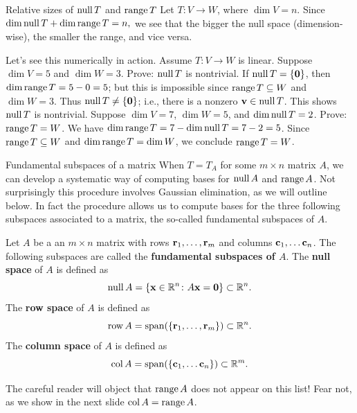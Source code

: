 \begin{frame}{Relative sizes of $\operatorname{null} T$ and $\operatorname{range} T$}
Let $T\colon V\rightarrow W$, where $\dim V=n$. Since 
$
\dim\operatorname{null} T+\dim\operatorname{range} T=n,
$
we see that the {\color{red} bigger} the null space (dimension-wise), the {\color{blue} smaller} the range, and vice versa. 

Let's see this numerically in action. Assume $T\colon V\rightarrow W$ is linear. 
\bb
\pause\ii Suppose $\dim V=5$ and $\dim W=3$. Prove: $\operatorname{null} T$ is nontrivial. 
\bpause
If $\operatorname{null} T=\{{\mathbf 0}\}$, then $\dim\operatorname{range} T=5-0=5$; but this is impossible since $\operatorname{range} T\subseteq W$ and $\dim W=3$. Thus $\operatorname{null} T\ne \{{\mathbf 0}\}$; i.e., there is a nonzero ${\mathbf v}\in\operatorname{null} T$. This shows $\operatorname{null} T$ is nontrivial. 
\pause\ii Suppose $\dim V=7$, $\dim W=5$, and $\dim\operatorname{null} T=2$. Prove: $\operatorname{range} T= W$. 
\bpause 
We have $\dim\operatorname{range} T=7-\dim\operatorname{null} T=7-2=5$. Since $\operatorname{range} T\subseteq W$ and $\dim\operatorname{range} T=\dim W$, we conclude $\operatorname{range} T=W$. 
\ee
\end{frame}

\begin{frame}{Fundamental subspaces of a matrix}
When $T=T_A$ for some $m\times n$ matrix $A$, we can develop a systematic way of computing bases for $\operatorname{null} A$ and $\operatorname{range} A$. Not surprisingly this procedure involves Gaussian elimination, as we will outline below. 
\bspace 
In fact the procedure allows us to compute bases for the three following subspaces associated to a matrix, the so-called \alert{fundamental subspaces} of $A$. 

\pause
\begin{definition}
Let $A$ be a an $m\times n$ matrix with rows ${\mathbf r}_1,\dots, {\mathbf r}_m$ and columns ${\mathbf c}_1,\dots {\mathbf c}_n$. The following subspaces are called the {\bf fundamental subspaces of $A$}. 
\bb
\ii The {\bf null space} of $A$ is defined as 
\[
\operatorname{null} A =\{{\mathbf x}\in{\mathbb R}^n\colon A{\mathbf x}={\mathbf 0}\}\subset {\mathbb R}^n.
\]
\ii The {\bf row space} of $A$ is defined as 
\[
\operatorname{row} A =\operatorname{span}(\{{\mathbf r}_1,\dots, {\mathbf r}_m\})\subset{\mathbb R}^n.
\]
\ii The {\bf column space} of $A$ is defined as 
\[
\operatorname{col} A=\operatorname{span}(\{{\mathbf c}_1,\dots {\mathbf c}_n\})\subset{\mathbb R}^m. 
\]
\ee
\end{definition}
\pause 
The careful reader will object that $\operatorname{range} A$ does not appear on this list! Fear not, as we show in the next slide \alert{$\operatorname{col} A=\operatorname{range} A$}. 
\end{frame}


